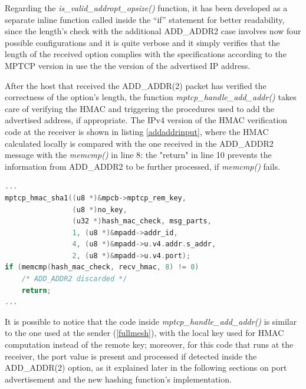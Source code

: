 Regarding the \textit{is\_valid\_addropt\_opsize()} function, it has been developed as a separate inline function called inside the ``if'' statement for better readability, since the length's check with the additional ADD\_ADDR2 case involves now four possible configurations and it is quite verbose and it simply verifies that the length of the received option complies with the specifications according to the MPTCP version in use the the version of the advertised IP address.

After the host that received the ADD\_ADDR(2) packet has verified the correctness of the option's length, the function \textit{mptcp\_handle\_add\_addr()} takes care of verifying the HMAC and triggering the procedures used to add the advertised address, if appropriate. The IPv4 version of the HMAC verification code at the receiver is shown in listing \ref{addaddrinput}, where the HMAC calculated locally is compared with the one received in the ADD\_ADDR2 message with the \textit{memcmp()} in line 8: the "return" in line 10 prevents the information from ADD\_ADDR2 to be further processed, if \textit{memcmp()} fails. 

\begin{lstlisting}[language=c, caption=\textit{New ADD\_ADDR HMAC calculation (incoming packet)}, label=addaddrinput]
...
mptcp_hmac_sha1((u8 *)&mpcb->mptcp_rem_key,
				(u8 *)no_key,
				(u32 *)hash_mac_check, msg_parts,
				1, (u8 *)&mpadd->addr_id,
				4, (u8 *)&mpadd->u.v4.addr.s_addr,
				2, (u8 *)&mpadd->u.v4.port);
if (memcmp(hash_mac_check, recv_hmac, 8) != 0)
	/* ADD_ADDR2 discarded */
	return;
...
\end{lstlisting}

It is possible to notice that the code inside \textit{mptcp\_handle\_add\_addr()} is similar to the one used at the sender (\ref{fullmesh}), with the local key used for HMAC computation instead of the remote key; moreover, for this code that runs at the receiver, the port value is present and processed if detected inside the ADD\_ADDR(2) option, as it explained later in the following sections on port advertisement and the new hashing function's implementation.

